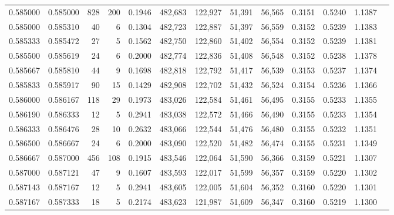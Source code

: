 \begin{tabular}{rrrrrrrrrrrrr}
0.585000 & 0.585000 &   828 & 200 &                                     0.1946 & 482,683 & 122,927 &  51,391 &  56,565 & 0.3151 & 0.5240 & 1.1387 \\
0.585000 & 0.585310 &    40 &   6 &                                     0.1304 & 482,723 & 122,887 &  51,397 &  56,559 & 0.3152 & 0.5239 & 1.1383 \\
0.585333 & 0.585472 &    27 &   5 &                                     0.1562 & 482,750 & 122,860 &  51,402 &  56,554 & 0.3152 & 0.5239 & 1.1381 \\
0.585500 & 0.585619 &    24 &   6 &                                     0.2000 & 482,774 & 122,836 &  51,408 &  56,548 & 0.3152 & 0.5238 & 1.1378 \\
0.585667 & 0.585810 &    44 &   9 &                                     0.1698 & 482,818 & 122,792 &  51,417 &  56,539 & 0.3153 & 0.5237 & 1.1374 \\
0.585833 & 0.585917 &    90 &  15 &                                     0.1429 & 482,908 & 122,702 &  51,432 &  56,524 & 0.3154 & 0.5236 & 1.1366 \\
0.586000 & 0.586167 &   118 &  29 &                                     0.1973 & 483,026 & 122,584 &  51,461 &  56,495 & 0.3155 & 0.5233 & 1.1355 \\
0.586190 & 0.586333 &    12 &   5 &                                     0.2941 & 483,038 & 122,572 &  51,466 &  56,490 & 0.3155 & 0.5233 & 1.1354 \\
0.586333 & 0.586476 &    28 &  10 &                                     0.2632 & 483,066 & 122,544 &  51,476 &  56,480 & 0.3155 & 0.5232 & 1.1351 \\
0.586500 & 0.586667 &    24 &   6 &                                     0.2000 & 483,090 & 122,520 &  51,482 &  56,474 & 0.3155 & 0.5231 & 1.1349 \\
0.586667 & 0.587000 &   456 & 108 &                                     0.1915 & 483,546 & 122,064 &  51,590 &  56,366 & 0.3159 & 0.5221 & 1.1307 \\
0.587000 & 0.587121 &    47 &   9 &                                     0.1607 & 483,593 & 122,017 &  51,599 &  56,357 & 0.3159 & 0.5220 & 1.1302 \\
0.587143 & 0.587167 &    12 &   5 &                                     0.2941 & 483,605 & 122,005 &  51,604 &  56,352 & 0.3160 & 0.5220 & 1.1301 \\
0.587167 & 0.587333 &    18 &   5 &                                     0.2174 & 483,623 & 121,987 &  51,609 &  56,347 & 0.3160 & 0.5219 & 1.1300 \\

\end{tabular}
